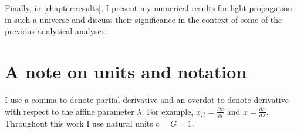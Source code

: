 Finally, in \autoref{chapter:results}, I present my numerical results for light propagation in such a universe and discuss their significance in the context of some of the previous analytical analyses. 

\section{A note on units and notation}
I use a comma to denote partial derivative and an overdot to denote derivative with respect to the affine parameter $\lambda$. For example, $x_{,t} = \frac{\partial x}{\partial t}$ and $\dot{x} = \frac{dx}{d\lambda}$. Throughout this work I use natural units $c = G = 1$. 
